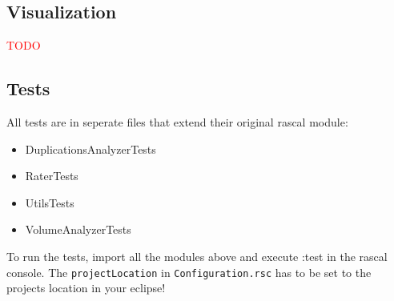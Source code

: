 \documentclass{uva-inf-article}
\newcommand\todo[1]{\textcolor{red}{#1}}
\begin{document}
\subsection{Visualization}

\todo{TODO}

\subsection{Tests}

All tests are in seperate files that extend their original rascal
module:

\begin{itemize}
\item
  DuplicationsAnalyzerTests
\item
  RaterTests
\item
  UtilsTests
\item
  VolumeAnalyzerTests
\end{itemize}

To run the tests, import all the modules above and execute :test in the
rascal console. The \texttt{projectLocation} in
\texttt{Configuration.rsc} has to be set to the projects location in
your eclipse!



\printbibliography


\end{document}
